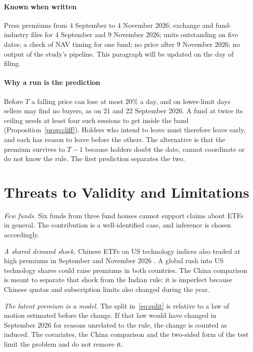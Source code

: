 \paragraph{Known when written} Press premiums from 4 September to 4 November 2026; exchange and fund-industry files for 4 September and 9 November 2026; units outstanding on five dates; a check of NAV timing for one fund; no price after 9 November 2026; no output of the study's pipeline. This paragraph will be updated on the day of filing.

\paragraph{Why a run is the prediction} Before $T$ a falling price can lose at most 20\% a day, and on lower-limit days sellers may find no buyers, as on 21 and 22 September 2026. A fund at twice its ceiling needs at least four such sessions to get inside the band (Proposition~\ref{prop:cliff}). Holders who intend to leave must therefore leave early, and each has reason to leave before the others. The alternative is that the premium survives to $T-1$ because holders doubt the date, cannot coordinate \citep{abreu2003bubbles} or do not know the rule. The first prediction separates the two.

\section{Threats to Validity and Limitations}\label{sec:limits}
\emph{Few funds.} Six funds from three fund houses cannot support claims about ETFs in general. The contribution is a well-identified case, and inference is chosen accordingly.

\emph{A shared demand shock.} Chinese ETFs on US technology indices also traded at high premiums in September and November 2026 \citep{caixin2026nov}. A global rush into US technology shares could raise premiums in both countries. The China comparison is meant to separate that shock from the Indian rule; it is imperfect because Chinese quotas and subscription limits also changed during the year.

\emph{The latent premium is a model.} The split in~\eqref{eq:split} is relative to a law of motion estimated before the change. If that law would have changed in September 2026 for reasons unrelated to the rule, the change is counted as induced. The covariates, the China comparison and the two-sided form of the test limit the problem and do not remove it.

